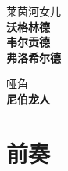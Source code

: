 \documentclass[10.5pt,openany]{ctexbook}
\begin{document}
\begin{center}
{\small\color{stage}莱茵河女儿}\\[0.8ex]
\textbf{沃格林德}\\[0.3ex]
\textbf{韦尔贡德}\\[0.3ex]
\textbf{弗洛希尔德}\\[0.3ex]
\par\vspace{1.0ex}
{\small\color{stage}哑角}\\[0.8ex]
\textbf{尼伯龙人}\\[0.3ex]
\par\vspace{1.0ex}
\end{center}

\chapter*{前奏}
\end{document}
